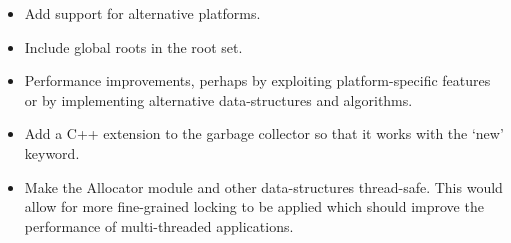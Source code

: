 \documentclass[../diss.tex]{subfiles}
\begin{document}
\begin{itemize}
    \item Add support for alternative platforms.
    \item Include global roots in the root set.
    \item Performance improvements, perhaps by exploiting platform-specific features or by implementing alternative data-structures and algorithms.
    \item Add a C++ extension to the garbage collector so that it works with the `new' keyword.
    \item Make the Allocator module and other data-structures thread-safe. This would allow for more fine-grained locking to be applied which should improve the performance of multi-threaded applications.
\end{itemize}
\end{document}
